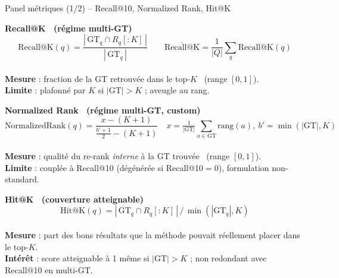 \documentclass[aspectratio=169,10pt]{beamer}
\begin{document}
\begin{frame}{Panel métriques (1/2) -- Recall@10, Normalized Rank, Hit@K}
  \footnotesize

  \textbf{\color{accent}Recall@K \ (régime multi-GT)}
  \vspace{-0.2em}
  \[
    \mathrm{Recall@K}(q) = \frac{|\,\mathrm{GT}_q \cap R_q[{:}K]\,|}{|\,\mathrm{GT}_q\,|}
    \qquad
    \overline{\mathrm{Recall@K}} = \frac{1}{|Q|}\sum_q \mathrm{Recall@K}(q)
  \]
  \vspace{-0.6em} \\
  \textbf{Mesure} : fraction de la GT retrouvée dans le top-$K$ \ (range $[0,1]$). \\
  \textbf{Limite} : plafonné par $K$ si $|\mathrm{GT}|>K$ ; aveugle au rang.

  \vspace{0.3em}\hrulefill\vspace{0.2em}

  \textbf{\color{accent}Normalized Rank \ (régime multi-GT, custom)}
  \vspace{-0.2em}
  \[
    \mathrm{NormalizedRank}(q) = \frac{x - (K{+}1)}{\frac{b'+1}{2} - (K{+}1)}
    \quad
    x = \tfrac{1}{|\mathrm{GT}|}\!\!\sum_{a\in\mathrm{GT}}\!\!\mathrm{rang}(a),\
    b' = \min(|\mathrm{GT}|, K)
  \]
  \vspace{-0.6em} \\
  \textbf{Mesure} : qualité du re-rank \emph{interne} à la GT trouvée \ (range $[0,1]$). \\
  \textbf{Limite} : couplée à Recall@10 (dégénérée si Recall@10${=}0$), formulation non-standard.

  \vspace{0.3em}\hrulefill\vspace{0.2em}

  \textbf{\color{ok}Hit@K \ (couverture atteignable)}
  \vspace{-0.2em}
  \[
    \mathrm{Hit@K}(q) =
    |\,\mathrm{GT}_q \cap R_q[{:}K]\,| \,/\, \min(|\mathrm{GT}_q|,K)
  \]
  \vspace{-0.6em} \\
  \textbf{Mesure} : part des bons résultats que la méthode pouvait réellement placer dans le top-$K$. \\
  \textbf{Intérêt} : score atteignable à 1 même si $|\mathrm{GT}|>K$ ; non redondant avec Recall@10 en multi-GT.
\end{frame}
\end{document}
